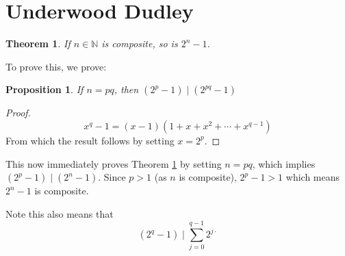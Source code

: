 \documentclass{article}
\newtheorem{thm}{Theorem}
\newtheorem{prop}{Proposition}
\newcommand{\nat}{\ensuremath{\mathbb{N}}}
\begin{document}
{}

\section{Underwood Dudley}
\begin{thm}\label{composite_2_power}
  If $n\in \nat$ is composite, so is $2^n - 1$.
\end{thm}
To prove this, we prove:
\begin{prop}
  If $n = pq$, then $(2^p - 1)\mid (2^{pq}-1)$
\end{prop}
\begin{proof}
  \[x^q - 1 = (x - 1)(1 + x + x^2 +\cdots+ x^{q-1})\]
  From which the result follows by setting $x = 2^p$.
\end{proof}

This now immediately proves Theorem \ref{composite_2_power} by setting
$n = pq$, which implies $(2^p - 1) \mid (2^n - 1)$. Since $p > 1$ (as $n$
is composite), $2^p - 1 > 1$ which means $2^n - 1$ is composite.

Note this also means that
\[(2^q - 1) \mid\sum_{j=0}^{q-1}2^{j\cdotp}\]
\end{document}
